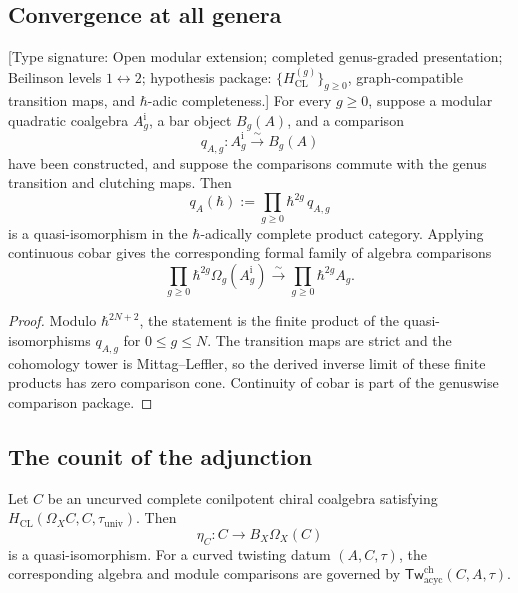 \subsection{Convergence at all genera}

\begin{theorem}
\label{thm:genus-graded-convergence}
\textup{[Type signature: Open modular extension; completed
genus-graded presentation; Beilinson levels
\(1\leftrightarrow2\); hypothesis package:
\(\{H_{\mathrm{CL}}^{(g)}\}_{g\geq0}\), graph-compatible
transition maps, and \(\hbar\)-adic completeness.]}
For every \(g\geq0\), suppose a modular quadratic coalgebra
\(A_g^{\mathrm i}\), a bar object \(B_g(A)\), and a comparison
\[
q_{A,g}\colon A_g^{\mathrm i}\xrightarrow{\sim}B_g(A)
\]
have been constructed, and suppose the comparisons commute with the
genus transition and clutching maps.  Then
\[
q_A(\hbar):=\prod_{g\geq0}
\hbar^{2g}\,q_{A,g}
\]
is a quasi-isomorphism in the \(\hbar\)-adically complete product
category.  Applying continuous cobar gives the corresponding formal
family of algebra comparisons
\[
\prod_{g\geq0}\hbar^{2g}\Omega_g(A_g^{\mathrm i})
\xrightarrow{\sim}
\prod_{g\geq0}\hbar^{2g}A_g .
\]
\end{theorem}

\begin{proof}
Modulo \(\hbar^{2N+2}\), the statement is the finite product of the
quasi-isomorphisms \(q_{A,g}\) for \(0\leq g\leq N\).
The transition maps are strict and the cohomology tower is
Mittag--Leffler, so the derived inverse limit of these finite products
has zero comparison cone.  Continuity of cobar is part of the
genuswise comparison package.
\end{proof}

\subsection{The counit of the adjunction}

\begin{proposition}
\label{prop:counit-qi}
Let \(C\) be an uncurved complete conilpotent chiral coalgebra
satisfying
\(H_{\mathrm{CL}}(\Omega_XC,C,\tau_{\mathrm{univ}})\).
Then
\[
\eta_C\colon C\longrightarrow B_X\Omega_X(C)
\]
is a quasi-isomorphism.  For a curved twisting datum
\((A,C,\tau)\), the corresponding algebra and module comparisons are
governed by
\(\mathsf{Tw}^{\mathrm{ch}}_{\mathrm{acyc}}(C,A,\tau)\).
\end{proposition}


